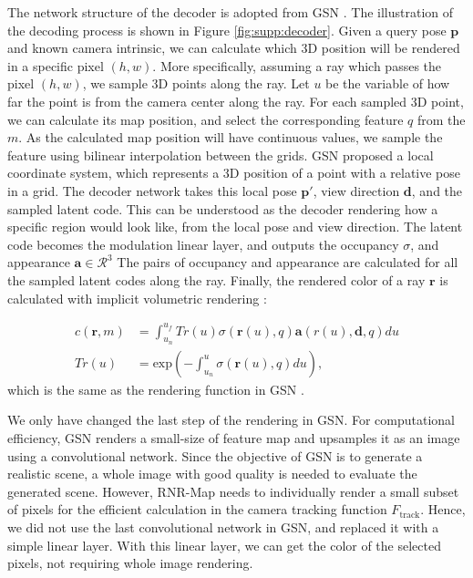\documentclass[10pt,twocolumn,letterpaper]{article}
\begin{document}
The network structure of the decoder is adopted from GSN \cite{GSN}.
%
The illustration of the decoding process is shown in Figure \ref{fig:supp:decoder}.
%
Given a query pose $\mathbf{p}$ and known camera intrinsic, we can calculate which 3D position will be rendered in a specific pixel $(h,w)$.
%
More specifically, assuming a ray which passes the pixel $(h,w)$, we sample 3D points along the ray.
%
Let $u$ be the variable of how far the point is from the camera center along the ray.
%
For each sampled 3D point, we can calculate its map position, and select the corresponding feature $q$ from the $m$.
%
As the calculated map position will have continuous values, we sample the feature using bilinear interpolation between the grids.
%
GSN proposed a local coordinate system, which represents a 3D position of a point with a relative pose in a grid. 
%
The decoder network takes this local pose $\mathbf{p'}$, view direction $\mathbf{d}$, and the sampled latent code.
%
This can be understood as the decoder rendering how a specific region would look like, from the local pose and view direction.
%
The latent code becomes the modulation linear layer, and outputs the occupancy $\sigma$, and appearance $\mathbf{a} \in \mathcal{R}^3$
%
The pairs of occupancy and appearance are calculated for all the sampled latent codes along the ray.
%
Finally, the rendered color of a ray $\mathbf{r}$ is calculated with implicit volumetric rendering \cite{Nerf}:

\begin{equation}
\begin{split}
    c(\mathbf{r},m) &= \int_{u_n}^{u_f} Tr(u) \sigma(\mathbf{r}(u),q)\mathbf{a}(r(u), \mathbf{d}, q) du \\
    Tr(u)  &= \mathrm{exp} (-\int_{u_n}^{u} \sigma(\mathbf{r}(u), q) du),
\end{split}
\end{equation}
which is the same as the rendering function in GSN \cite{GSN}.

We only have changed the last step of the rendering in GSN. 
%
For computational efficiency, GSN renders a small-size of feature map and upsamples it as an image using a convolutional network.
%
Since the objective of GSN is to generate a realistic scene, a whole image with good quality is needed to evaluate the generated scene.
%
However, RNR-Map needs to individually render a small subset of pixels for the efficient calculation in the camera tracking function $F_\mathrm{track}$.
%
Hence, we did not use the last convolutional network in GSN, and replaced it with a simple linear layer.
%
With this linear layer, we can get the color of the selected pixels, not requiring whole image rendering.
\end{document}

